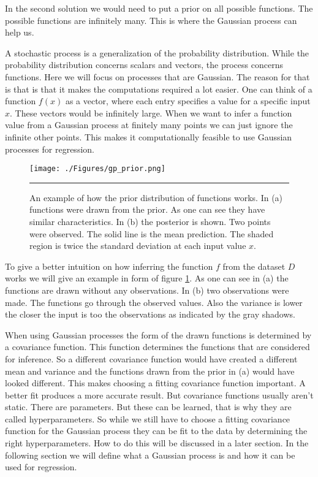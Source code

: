 In the second solution we would need to put a prior on all possible functions. The possible functions are infinitely many. This is where the Gaussian process can help us. 

A stochastic process is a generalization of the probability distribution. While the probability distribution concerns scalars and vectors, the process concerns functions.\cite[p. 2]{Rasmussen:2005:GPM:1162254} Here we will focus on processes that are Gaussian. The reason for that is that is that it makes the computations required a lot easier. 
One can think of a function $f(x)$ as a vector, where each entry specifies a value for a specific input $x$. These vectors would be infinitely large. When we want to infer a function value from a Gaussian process at finitely many points we can just ignore the infinite other points. This makes it computationally feasible to use Gaussian processes for regression. \cite[p. 2]{Rasmussen:2005:GPM:1162254} 
\begin{figure}[htbp]
	\centering
		\texttt{[image: ./Figures/gp\_prior.png]}
		\rule{35em}{0.5pt}
	\caption[prior]{An example of how the prior distribution of functions works. In (a) functions were drawn from the prior. As one can see they have similar characteristics. In (b) the posterior is shown. Two points were observed. The solid line is the mean prediction. The shaded region is twice the standard deviation at each input value $x$. \cite[p. 3]{Rasmussen:2005:GPM:1162254}}
	\label{fig:gp_prior}
\end{figure}

To give a better intuition on how inferring the function $f$ from the dataset $D$ works we will give an example in form of figure \ref{fig:gp_prior}. As one can see in (a) the functions are drawn without any observations. In (b) two observations were made. The functions go through the observed values. Also the variance is lower the closer the input is too the observations as indicated by the gray shadows. 

When using Gaussian processes the form of the drawn functions is determined by a covariance function.\cite[p. 4]{Rasmussen:2005:GPM:1162254} This function determines the functions that are considered for inference. So a different covariance function would have created a different mean and variance and the functions drawn from the prior in (a) would have looked different. This makes choosing a fitting covariance function important. A better fit produces a more accurate result. But covariance functions usually aren't static. There are parameters. But these can be learned, that is why they are called hyperparameters. So while we still have to choose a fitting covariance function for the Gaussian process they can be fit to the data by determining the right hyperparameters. How to do this will be discussed in a later section. In the following section we will define what a Gaussian process is and how it can be used for regression. 

